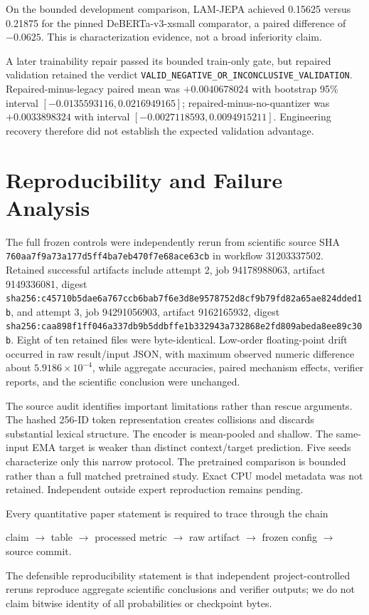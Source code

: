 \documentclass[conference]{IEEEtran}
\begin{document}
On the bounded development comparison, LAM-JEPA achieved 0.15625 versus 0.21875 for the pinned DeBERTa-v3-xsmall comparator, a paired difference of $-0.0625$. This is characterization evidence, not a broad inferiority claim.

A later trainability repair passed its bounded train-only gate, but repaired validation retained the verdict \texttt{VALID\_NEGATIVE\_OR\_INCONCLUSIVE\_VALIDATION}. Repaired-minus-legacy paired mean was $+0.0040678024$ with bootstrap 95\% interval $[-0.0135593116,0.0216949165]$; repaired-minus-no-quantizer was $+0.0033898324$ with interval $[-0.0027118593,0.0094915211]$. Engineering recovery therefore did not establish the expected validation advantage.

\section{Reproducibility and Failure Analysis}
The full frozen controls were independently rerun from scientific source SHA \texttt{760aa7f9a73a177d5ff4ba7eb470f7e68ace63cb} in workflow 31203337502. Retained successful artifacts include attempt 2, job 94178988063, artifact 9149336081, digest \texttt{sha256:c45710b5dae6a767ccb6bab7f6e3d8e9578752d8cf9b79fd82a65ae824dded1b}, and attempt 3, job 94291056903, artifact 9162165932, digest \texttt{sha256:caa898f1ff046a337db9b5ddbffe1b332943a732868e2fd809abeda8ee89c30b}. Eight of ten retained files were byte-identical. Low-order floating-point drift occurred in raw result/input JSON, with maximum observed numeric difference about $5.9186\times10^{-4}$, while aggregate accuracies, paired mechanism effects, verifier reports, and the scientific conclusion were unchanged.

The source audit identifies important limitations rather than rescue arguments. The hashed 256-ID token representation creates collisions and discards substantial lexical structure. The encoder is mean-pooled and shallow. The same-input EMA target is weaker than distinct context/target prediction. Five seeds characterize only this narrow protocol. The pretrained comparison is bounded rather than a full matched pretrained study. Exact CPU model metadata was not retained. Independent outside expert reproduction remains pending.

Every quantitative paper statement is required to trace through the chain
\begin{center}
claim $\rightarrow$ table $\rightarrow$ processed metric $\rightarrow$ raw artifact $\rightarrow$ frozen config $\rightarrow$ source commit.
\end{center}
The defensible reproducibility statement is that independent project-controlled reruns reproduce aggregate scientific conclusions and verifier outputs; we do not claim bitwise identity of all probabilities or checkpoint bytes.
\end{document}
